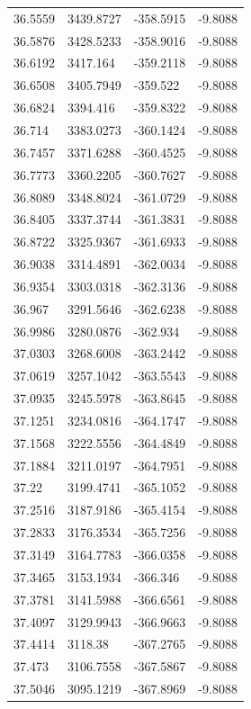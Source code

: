 \begin{table}[H]
\begin{tabular}{llll}
36.5559 & 3439.8727 & -358.5915 & -9.8088 \\
36.5876 & 3428.5233 & -358.9016 & -9.8088 \\
36.6192 & 3417.164 & -359.2118 & -9.8088 \\
36.6508 & 3405.7949 & -359.522 & -9.8088 \\
36.6824 & 3394.416 & -359.8322 & -9.8088 \\
36.714 & 3383.0273 & -360.1424 & -9.8088 \\
36.7457 & 3371.6288 & -360.4525 & -9.8088 \\
36.7773 & 3360.2205 & -360.7627 & -9.8088 \\
36.8089 & 3348.8024 & -361.0729 & -9.8088 \\
36.8405 & 3337.3744 & -361.3831 & -9.8088 \\
36.8722 & 3325.9367 & -361.6933 & -9.8088 \\
36.9038 & 3314.4891 & -362.0034 & -9.8088 \\
36.9354 & 3303.0318 & -362.3136 & -9.8088 \\
36.967 & 3291.5646 & -362.6238 & -9.8088 \\
36.9986 & 3280.0876 & -362.934 & -9.8088 \\
37.0303 & 3268.6008 & -363.2442 & -9.8088 \\
37.0619 & 3257.1042 & -363.5543 & -9.8088 \\
37.0935 & 3245.5978 & -363.8645 & -9.8088 \\
37.1251 & 3234.0816 & -364.1747 & -9.8088 \\
37.1568 & 3222.5556 & -364.4849 & -9.8088 \\
37.1884 & 3211.0197 & -364.7951 & -9.8088 \\
37.22 & 3199.4741 & -365.1052 & -9.8088 \\
37.2516 & 3187.9186 & -365.4154 & -9.8088 \\
37.2833 & 3176.3534 & -365.7256 & -9.8088 \\
37.3149 & 3164.7783 & -366.0358 & -9.8088 \\
37.3465 & 3153.1934 & -366.346 & -9.8088 \\
37.3781 & 3141.5988 & -366.6561 & -9.8088 \\
37.4097 & 3129.9943 & -366.9663 & -9.8088 \\
37.4414 & 3118.38 & -367.2765 & -9.8088 \\
37.473 & 3106.7558 & -367.5867 & -9.8088 \\
37.5046 & 3095.1219 & -367.8969 & -9.8088 \\

\end{tabular}
\end{table}

